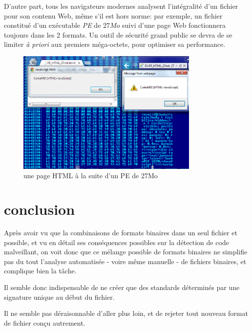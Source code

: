 D'autre part, tous les navigateurs modernes analysent l'intégralité d'un fichier pour son contenu Web, même s'il est hors norme: par exemple, un fichier constitué d'un exécutable {\em PE} de $27 Mo$ suivi d'une page Web fonctionnera toujours dans les 2 formats. Un outil de sécurité grand public se devra de se limiter {\it à priori} aux premiers méga-octets, pour optimiser sa performance.

\begin{figure}[ht]
  \centering
  \includegraphics[width=0.8\textwidth]{albertini/img/PE_HTML_27mb}
  \caption{une page HTML à la suite d'un PE de 27Mo}
  \label{fig:albertini:PE_HTML_27mb}
\end{figure}

\section{conclusion}
Après avoir vu que la combinaisons de formats binaires dans un seul fichier et possible, et vu en détail ses conséquences possibles sur la détection de code malveillant, on voit donc que ce mélange possible de formats binaires ne simplifie pas du tout l'analyse automatisée - voire même manuelle - de fichiers binaires, et complique bien la tâche.

Il semble donc indispensable de ne créer que des standards déterminés par une signature unique au début du fichier.

Il ne semble pas déraisonnable d'aller plus loin, et de rejeter tout nouveau format de fichier conçu autrement.


